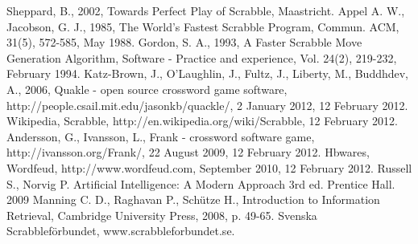\documentclass[a4paper, 12pt]{report}
\begin{document}
\begin{thebibliography}{100}  
   Sheppard, B., 2002, Towards Perfect Play of Scrabble, Maastricht.
   Appel A. W., Jacobson, G. J., 1985, The World’s Fastest Scrabble Program, Commun. ACM, 31(5), 572-585, May 1988.
 Gordon, S. A., 1993, A Faster Scrabble Move Generation Algorithm, Software - Practice and experience, Vol. 24(2), 219-232, February 1994.
 Katz-Brown, J., O’Laughlin, J., Fultz, J., Liberty, M., Buddhdev, A., 2006, Quakle - open source crossword game software, http://people.csail.mit.edu/jasonkb/quackle/, 2 January 2012,  12 February 2012.
 Wikipedia, Scrabble, http://en.wikipedia.org/wiki/Scrabble, 12 February 2012.
 Andersson, G., Ivansson, L., Frank - crossword software game, http://ivansson.org/Frank/, 22 August 2009, 12 February 2012.
 Hbwares, Wordfeud, http://www.wordfeud.com, September 2010, 12 February 2012.
 Russell S., Norvig P. Artificial Intelligence: A Modern Approach 3rd ed. Prentice Hall. 2009
 Manning C. D., Raghavan P., Schütze H., Introduction to Information Retrieval, Cambridge University Press, 2008, p. 49-65.
 Svenska Scrabbleförbundet, www.scrabbleforbundet.se.
\end{thebibliography}
\end{document}
